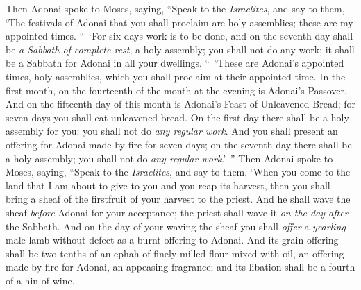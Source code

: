 \begin{biblechapter} %
 Then Adonai spoke to Moses, saying,
\verse “Speak to the \textit{Israelites}, and say to them, ‘The festivals of Adonai that you shall proclaim are holy assemblies; these are my appointed times.
 “ ‘For six days work is to be done, and on the seventh day shall be \textit{a Sabbath of complete rest}, a holy assembly; you shall not do any work; it shall be a Sabbath for Adonai in all your dwellings.
 “ ‘These are Adonai’s appointed times, holy assemblies, which you shall proclaim at their appointed time.
\verse In the first month, on the fourteenth of the month at the evening is Adonai’s Passover.
\verse And on the fifteenth day of this month is Adonai’s Feast of Unleavened Bread; for seven days you shall eat unleavened bread.
\verse On the first day there shall be a holy assembly for you; you shall not do \textit{any regular work}.
\verse And you shall present an offering for Adonai made by fire for seven days; on the seventh day there shall be a holy assembly; you shall not do \textit{any regular work}.’ ”
 Then Adonai spoke to Moses, saying,
\verse “Speak to the \textit{Israelites}, and say to them, ‘When you come to the land that I am about to give to you and you reap its harvest, then you shall bring a sheaf of the firstfruit of your harvest to the priest.
\verse And he shall wave the sheaf \textit{before} Adonai for your acceptance; the priest shall wave it \textit{on the day after} the Sabbath.
\verse And on the day of your waving the sheaf you shall \textit{offer} a \textit{yearling} male lamb without defect as a burnt offering to Adonai.
\verse And its grain offering shall be two-tenths of an ephah of finely milled flour mixed with oil, an offering made by fire for Adonai, an appeasing fragrance; and its libation shall be a fourth of a hin of wine.

\end{biblechapter}
